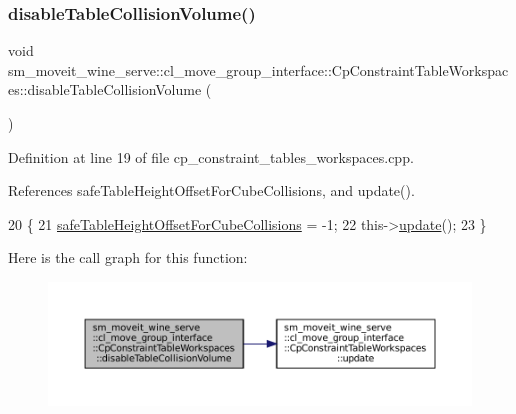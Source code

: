 \subsubsection{\texorpdfstring{disable\+Table\+Collision\+Volume()}{disableTableCollisionVolume()}}
{\footnotesize\ttfamily void sm\+\_\+moveit\+\_\+wine\+\_\+serve\+::cl\+\_\+move\+\_\+group\+\_\+interface\+::\+Cp\+Constraint\+Table\+Workspaces\+::disable\+Table\+Collision\+Volume (\begin{DoxyParamCaption}{ }\end{DoxyParamCaption})}



Definition at line 19 of file cp\+\_\+constraint\+\_\+tables\+\_\+workspaces.\+cpp.



References safe\+Table\+Height\+Offset\+For\+Cube\+Collisions, and update().


\begin{DoxyCode}
20         \{
21             \hyperlink{classsm__moveit__wine__serve_1_1cl__move__group__interface_1_1CpConstraintTableWorkspaces_a5233fcac3ab6ce00f9e1c6e950462e58}{safeTableHeightOffsetForCubeCollisions} = -1;
22             this->\hyperlink{classsm__moveit__wine__serve_1_1cl__move__group__interface_1_1CpConstraintTableWorkspaces_af14a8a8c61b0dcfa6b062ba8493d5a5d}{update}();
23         \}
\end{DoxyCode}
Here is the call graph for this function\+:
\nopagebreak
\begin{figure}[H]
\begin{center}
\leavevmode
\includegraphics[width=350pt]{classsm__moveit__wine__serve_1_1cl__move__group__interface_1_1CpConstraintTableWorkspaces_a148f92278be1a7f9d4c6308d4971ea45_cgraph}
\end{center}
\end{figure}
\mbox{\label{classsm__moveit__wine__serve_1_1cl__move__group__interface_1_1CpConstraintTableWorkspaces_a7bb129fe7744909e2238ed94e61e3c30}} 
